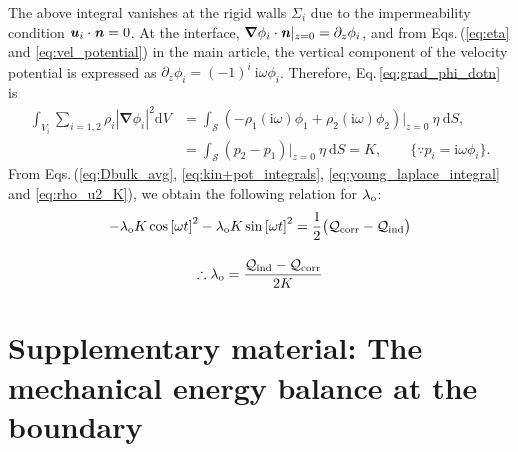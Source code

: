 \documentclass[aps,prfluids,reprint,superscriptaddress]{revtex4-2}
\newcommand{\h}[1]{\textbf{\textit{#1}}}
\newcommand{\ii}[1]{\text{#1}}
\newcommand{\nn}{\nonumber}
\newcommand{\mref}[1]{{\hypersetup{linkcolor=black}\ref{#1}}}
\numberwithin{equation}{section}
\begin{document}
The above integral vanishes at the rigid walls $\Sigma_i$ due to the impermeability condition $\h u_i \cdot \h n=0$. At the interface, $\bm\nabla\phi_i\cdot \h n|_{z=0} = \partial_z\phi_i$, and from Eqs.\,(\mref{eq:eta} and \mref{eq:vel_potential}) in the main article, the vertical component of the velocity potential is expressed as $\partial_z\phi_i = (-1)^i \:\ii i \omega \phi_i$. Therefore, Eq.\,\eqref{eq:grad_phi_dotn} is
 \begin{align}
 	\nn
 	\int_{V_i}\sum_{i=1,2} \rho_i |\bm\nabla \phi_i|^2 \mathrm dV &= \int_{\mathcal{S}} \left(
 	-\rho_1(\ii i\omega)\phi_1
 	+ \rho_2(\ii i\omega)\phi_2
 	\right)|_{z=0} \: \eta \:\mathrm dS,
 	\\
 	&= \int_{\mathcal{S}}
 	\left( p_2 - p_1 \right)|_{z=0} \: \eta \: \mathrm dS = K, 
 	\qquad \{ \because p_i = \ii i\omega\phi_i \}.
 	\label{eq:rho_u2_K}
 \end{align}
From Eqs.\,(\ref{eq:Dbulk_avg}, \ref{eq:kin+pot_integrals}, \ref{eq:young_laplace_integral} and \ref{eq:rho_u2_K}), we obtain the following relation for $\lambda_{\rm o}$:
\begin{gather}
	-\lambda_{\rm o} K \cos{[\omega t]}^2 - \lambda_{\rm o} K \sin{[\omega t]}^2  =   \frac{1}{2} \bigl(\mathcal{Q}_{\rm corr} - \mathcal{Q}_{\rm ind} \bigr)
	\\[10pt]
	\therefore 
	\lambda_{\rm o} = \dfrac{\mathcal{Q}_{\rm ind} - \mathcal{Q}_{\rm corr}}{2K}
\end{gather}



\section{Supplementary material: The mechanical energy balance at the boundary} 
\label{supplC}
\end{document}
